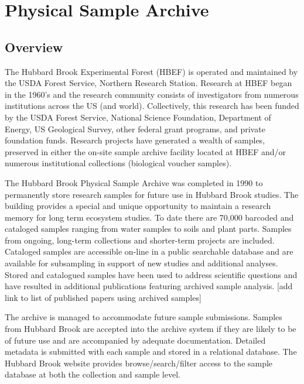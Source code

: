 \documentclass[
  letterpaper,
  DIV=11,
  numbers=noendperiod]{scrreprt}
\begin{document}

\chapter{Physical Sample Archive}\label{physical-sample-archive}

\section{Overview}\label{overview-4}

The Hubbard Brook Experimental Forest (HBEF) is operated and maintained
by the USDA Forest Service, Northern Research Station. Research at HBEF
began in the 1960's and the research community consists of investigators
from numerous institutions across the US (and world). Collectively, this
research has been funded by the USDA Forest Service, National Science
Foundation, Department of Energy, US Geological Survey, other federal
grant programs, and private foundation funds. Research projects have
generated a wealth of samples, preserved in either the on-site sample
archive facility located at HBEF and/or numerous institutional
collections (biological voucher samples).

The Hubbard Brook Physical Sample Archive was completed in 1990 to
permanently store research samples for future use in Hubbard Brook
studies. The building provides a special and unique opportunity to
maintain a research memory for long term ecosystem studies. To date
there are 70,000 barcoded and cataloged samples ranging from water
samples to soils and plant parts. Samples from ongoing, long-term
collections and shorter-term projects are included. Cataloged samples
are accessible on-line in a public searchable database and are available
for subsampling in support of new studies and additional analyses.
Stored and catalogued samples have been used to address scientific
questions and have resulted in additional publications featuring
archived sample analysis. {[}add link to list of published papers using
archived samples{]}

The archive is managed to accommodate future sample submissions. Samples
from Hubbard Brook are accepted into the archive system if they are
likely to be of future use and are accompanied by adequate
documentation. Detailed metadata is submitted with each sample and
stored in a relational database. The Hubbard Brook website provides
browse/search/filter access to the sample database at both the
collection and sample level.
\end{document}
